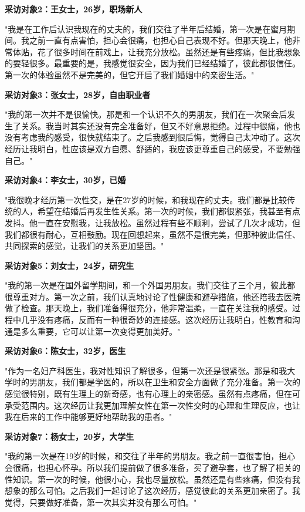 \begin{enumerate}
\textbf{采访对象2：王女士，26岁，职场新人}

"我是在工作后认识我现在的丈夫的，我们交往了半年后结婚，第一次是在蜜月期间。我之前一直有点害怕，担心会很痛，也担心自己表现不好。但那天晚上，他非常体贴，花了很多时间在前戏上，让我充分放松。虽然还是有些疼痛，但比我想象的要轻很多。最重要的是，我感觉很安全，因为我们已经结婚了，彼此都很信任。第一次的体验虽然不是完美的，但它开启了我们婚姻中的亲密生活。" 

\textbf{采访对象3：张女士，28岁，自由职业者}

"我的第一次并不是很愉快。那是和一个认识不久的男朋友，我们在一次聚会后发生了关系。我当时其实还没有完全准备好，但又不好意思拒绝。过程中很痛，他也没有考虑我的感受，很快就结束了。之后我感到很后悔，觉得自己太冲动了。这次经历让我明白，性应该是双方自愿、舒适的，我应该更尊重自己的感受，不要勉强自己。" 

\textbf{采访对象4：李女士，30岁，已婚}

"我很晚才经历第一次性交，是在27岁的时候，和我现在的丈夫。我们都是比较传统的人，希望在结婚后再发生性关系。第一次的时候，我们都很紧张，我甚至有点发抖。他一直在安慰我，让我放松。虽然过程有些不顺利，尝试了几次才成功，但我们都很有耐心，互相鼓励。现在回想起来，虽然不是很完美，但那种彼此信任、共同探索的感觉，让我们的关系更加坚固。" 

\textbf{采访对象5：刘女士，24岁，研究生}

"我的第一次是在国外留学期间，和一个外国男朋友。我们交往了三个月，彼此都很尊重对方。第一次之前，我们认真地讨论了性健康和避孕措施，他还陪我去医院做了检查。那天晚上，我们准备得很充分，他非常温柔，一直在关注我的感受。过程中几乎没有疼痛，反而有一种很奇妙的连接感。这次经历让我明白，性教育和沟通是多么重要，它可以让第一次变得更加美好。" 

\textbf{采访对象6：陈女士，32岁，医生}

"作为一名妇产科医生，我对性知识了解很多，但第一次还是很紧张。那是和我大学时的男朋友，我们都是学医的，所以在卫生和安全方面做了充分准备。第一次的感觉很特别，既有生理上的新奇感，也有心理上的亲密感。虽然有点疼痛，但在可承受范围内。这次经历让我更加理解女性在第一次性交时的心理和生理反应，也让我在后来的工作中能够更好地帮助我的患者。" 

\textbf{采访对象7：杨女士，20岁，大学生}

"我的第一次是在19岁的时候，和交往了半年的男朋友。我之前一直很害怕，担心会很痛，也担心怀孕。所以我们提前做了很多准备，买了避孕套，也了解了相关的性知识。第一次的时候，他很小心，我也尽量放松。虽然还是有些疼痛，但没有我想象的那么可怕。之后我们一起讨论了这次经历，感觉彼此的关系更加亲密了。我觉得，只要做好准备，第一次其实并没有那么可怕。" 


\end{enumerate}
